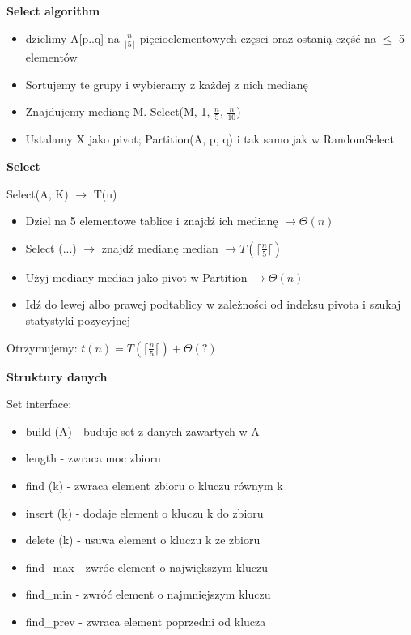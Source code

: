 \documentclass{article}
\begin{document}
    \vspace{1\baselineskip}
    \textbf{Select algorithm} \par
    \begin{itemize}
        \item dzielimy A[p..q] na $\frac{n}{\lfloor 5 \rfloor}$ pięcioelementowych częsci
        oraz ostanią część na $\leq$ 5 elementów
        \item Sortujemy te grupy i wybieramy z każdej z nich medianę
        \item Znajdujemy medianę M. Select(M, 1, $\frac{n}{5}$, $\frac{n}{10}$)
        \item Ustalamy X jako pivot; Partition(A, p, q) i tak samo jak w RandomSelect
    \end{itemize}

    \textbf{Select} \par
    Select(A, K) $\rightarrow$ T(n) \par
    \begin{itemize}
        \item Dziel na 5 elementowe tablice i znajdź ich medianę $\rightarrow \Theta(n)$
        \item Select (...) $\rightarrow$ znajdź medianę median $\rightarrow T(\lceil{\frac{n}{5}}\lceil)$ \par
        \item Użyj mediany median jako pivot w Partition $\rightarrow \Theta(n)$
        \item Idź do lewej albo prawej podtablicy w zależności od indeksu pivota i szukaj statystyki pozycyjnej
    \end{itemize}
    Otrzymujemy: $t(n) = T(\lceil{\frac{n}{5}}\lceil) + \Theta(?)$ \par
    \vspace{9\baselineskip}
    \textbf{Struktury danych} \par
    Set interface: \par
    \begin{itemize}
        \item build (A) - buduje set z danych zawartych w A
        \item length - zwraca moc zbioru
        \item find (k) - zwraca element zbioru o kluczu równym k
        \item insert (k) - dodaje element o kluczu k do zbioru
        \item delete (k) - usuwa element o kluczu k ze zbioru
        \item find\_max - zwróc element o największym kluczu
        \item find\_min - zwróć element o najmniejszym kluczu
        \item find\_prev - zwraca element poprzedni od klucza
    \end{itemize}
\end{document}
